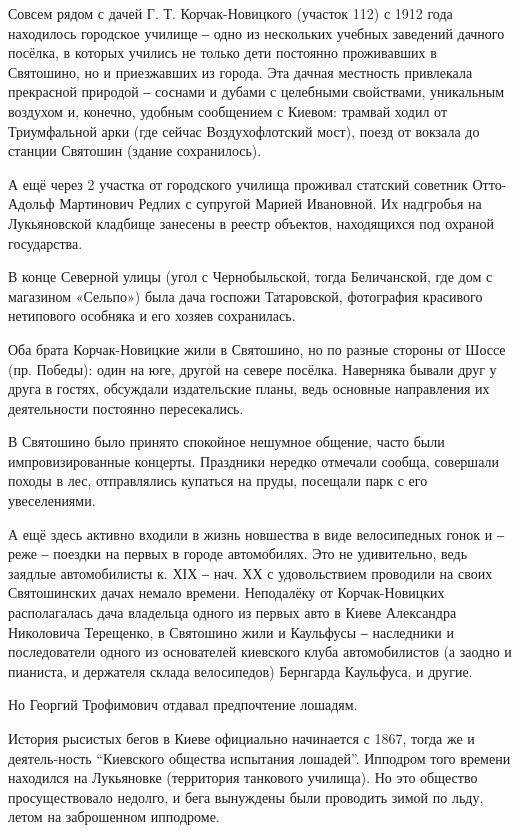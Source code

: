Совсем рядом с дачей  Г. Т. Корчак-Новицкого (участок 112) с 1912 года находилось
городское училище ‒ одно из нескольких учебных заведений дачного посёлка, в
которых учились не только дети постоянно проживавших в Святошино, но и
приезжавших из города. Эта дачная местность привлекала прекрасной природой ‒
соснами и дубами с целебными свойствами, уникальным воздухом и, конечно,
удобным сообщением с Киевом: трамвай ходил от Триумфальной арки (где сейчас
Воздухофлотский мост), поезд от вокзала до станции Святошин (здание
сохранилось).

А ещё через 2 участка от городского училища проживал статский советник
Отто-Адольф Мартинович Редлих с супругой Марией Ивановной. Их надгробья на
Лукьяновской кладбище занесены в реестр объектов, находящихся под охраной
государства. 

В конце Северной улицы (угол с Чернобыльской, тогда Беличанской, где дом с
магазином «Сельпо») была дача госпожи Татаровской, фотография красивого
нетипового особняка и его хозяев сохранилась. 

Оба брата Корчак-Новицкие жили в Святошино, но по разные стороны от Шоссе (пр.
Победы): один на юге, другой на севере посёлка. Наверняка бывали друг у друга в
гостях, обсуждали издательские планы, ведь основные направления их деятельности
постоянно пересекались. 

В Святошино было принято спокойное нешумное общение, часто были
импровизированные концерты. Праздники нередко отмечали сообща, совершали походы
в лес, отправлялись купаться на пруды, посещали парк с его увеселениями. 

А ещё здесь активно входили в жизнь новшества в виде велосипедных гонок и ‒
реже ‒ поездки на первых в городе автомобилях. Это не удивительно, ведь заядлые
автомобилисты к. ХІХ ‒ нач. ХХ с удовольствием проводили на своих Святошинских
дачах немало времени. Неподалёку от Корчак-Новицких располагалась дача
владельца одного из первых авто в Киеве Александра Николовича Терещенко, в
Святошино жили и Каульфусы ‒ наследники и последователи одного из основателей
киевского клуба автомобилистов (а заодно и пианиста, и держателя склада
велосипедов) Бернгарда Каульфуса, и другие.

Но Георгий Трофимович отдавал предпочтение лошадям. 

История рысистых бегов в Киеве официально начинается с 1867, тогда же и
деятель-ность \enquote{Киевского общества испытания лошадей}. Ипподром того времени
находился на Лукьяновке (территория танкового училища). Но это общество
просуществовало недолго, и бега вынуждены были проводить зимой по льду, летом
на заброшенном ипподроме. 

